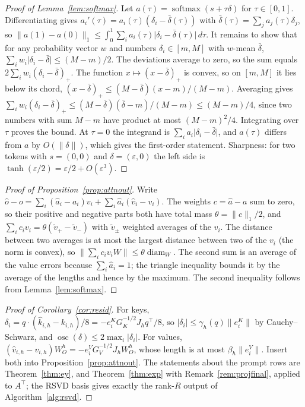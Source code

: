 \documentclass[10pt]{article}
\theoremstyle{plain}
\theoremstyle{definition}
\theoremstyle{remark}
\newcommand{\T}{^{\top}}
\DeclareMathOperator{\osc}{osc}
\newcommand{\softmax}{\operatorname{softmax}}
\begin{document}
\begin{proof}[Proof of Lemma~\ref{lem:softmax}]
Let $a(\tau)=\softmax(s+\tau\delta)$ for $\tau\in[0,1]$. Differentiating gives $a_i'(\tau)=a_i(\tau)(\delta_i-\bar\delta(\tau))$ with $\bar\delta(\tau)=\sum_ja_j(\tau)\delta_j$, so $\lVert a(1)-a(0)\rVert_1\le\int_0^1\sum_ia_i(\tau)\lvert\delta_i-\bar\delta(\tau)\rvert\,d\tau$. It remains to show that for any probability vector $w$ and numbers $\delta_i\in[m,M]$ with $w$-mean $\bar\delta$, $\sum_iw_i\lvert\delta_i-\bar\delta\rvert\le(M-m)/2$. The deviations average to zero, so the sum equals $2\sum_iw_i(\delta_i-\bar\delta)_+$. The function $x\mapsto(x-\bar\delta)_+$ is convex, so on $[m,M]$ it lies below its chord, $(x-\bar\delta)_+\le(M-\bar\delta)(x-m)/(M-m)$. Averaging gives $\sum_iw_i(\delta_i-\bar\delta)_+\le(M-\bar\delta)(\bar\delta-m)/(M-m)\le(M-m)/4$, since two numbers with sum $M-m$ have product at most $(M-m)^2/4$. Integrating over $\tau$ proves the bound. At $\tau=0$ the integrand is $\sum_ia_i\lvert\delta_i-\bar\delta\rvert$, and $a(\tau)$ differs from $a$ by $O(\lVert\delta\rVert)$, which gives the first-order statement. Sharpness: for two tokens with $s=(0,0)$ and $\delta=(\varepsilon,0)$ the left side is $\tanh(\varepsilon/2)=\varepsilon/2+O(\varepsilon^3)$.
\end{proof}

\begin{proof}[Proof of Proposition~\ref{prop:attnout}]
Write $\hat o-o=\sum_i(\hat a_i-a_i)v_i+\sum_i\hat a_i(\hat v_i-v_i)$. The weights $c=\hat a-a$ sum to zero, so their positive and negative parts both have total mass $\theta=\lVert c\rVert_1/2$, and $\sum_ic_iv_i=\theta(\tilde v_+-\tilde v_-)$ with $\tilde v_\pm$ weighted averages of the $v_i$. The distance between two averages is at most the largest distance between two of the $v_i$ (the norm is convex), so $\lVert\sum_ic_iv_iW\rVert\le\theta\operatorname{diam}_W$. The second sum is an average of the value errors because $\sum_i\hat a_i=1$; the triangle inequality bounds it by the average of the lengths and hence by the maximum. The second inequality follows from Lemma~\ref{lem:softmax}.
\end{proof}

\begin{proof}[Proof of Corollary~\ref{cor:resid}]
For keys, $\delta_i=q\cdot(\hat k_{i,h}-k_{i,h})/8=-e_i^KG_K^{-1/2}J_hq\T/8$, so $\lvert\delta_i\rvert\le\gamma_h(q)\lVert e_i^K\rVert$ by Cauchy--Schwarz, and $\osc(\delta)\le2\max_i\lvert\delta_i\rvert$. For values, $(\hat v_{i,h}-v_{i,h})W_O^h=-e_i^VG_V^{-1/2}J_hW_O^h$, whose length is at most $\beta_h\lVert e_i^V\rVert$. Insert both into Proposition~\ref{prop:attnout}. The statements about the prompt rows are Theorem~\ref{thm:ey}, and Theorem~\ref{thm:exp} with Remark~\ref{rem:projfinal}, applied to $A\T$; the RSVD basis gives exactly the rank-$R$ output of Algorithm~\ref{alg:rsvd}.
\end{proof}
\end{document}
